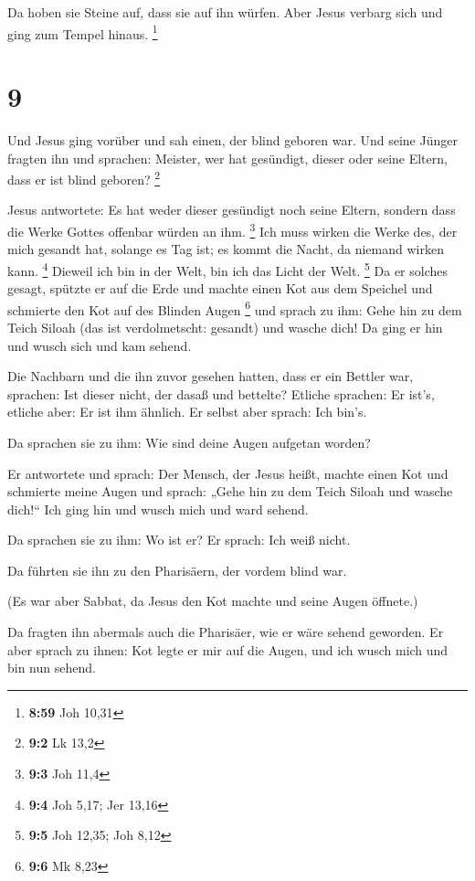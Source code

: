  Da hoben sie Steine auf, dass sie auf ihn würfen. Aber
Jesus verbarg sich und ging zum Tempel hinaus. \footnote{\textbf{8:59}
  Joh 10,31}

\hypertarget{section-4}{%
\section{9}\label{section-4}}

 Und Jesus ging vorüber und sah einen, der blind geboren
war.  Und seine Jünger fragten ihn und sprachen: Meister,
wer hat gesündigt, dieser oder seine Eltern, dass er ist blind geboren?
\footnote{\textbf{9:2} Lk 13,2}

 Jesus antwortete: Es hat weder dieser gesündigt noch seine
Eltern, sondern dass die Werke Gottes offenbar würden an ihm.
\footnote{\textbf{9:3} Joh 11,4}  Ich muss wirken die Werke
des, der mich gesandt hat, solange es Tag ist; es kommt die Nacht, da
niemand wirken kann. \footnote{\textbf{9:4} Joh 5,17; Jer 13,16}
 Dieweil ich bin in der Welt, bin ich das Licht der Welt.
\footnote{\textbf{9:5} Joh 12,35; Joh 8,12}  Da er solches
gesagt, spützte er auf die Erde und machte einen Kot aus dem Speichel
und schmierte den Kot auf des Blinden Augen \footnote{\textbf{9:6} Mk
  8,23}  und sprach zu ihm: Gehe hin zu dem Teich Siloah
(das ist verdolmetscht: gesandt) und wasche dich! Da ging er hin und
wusch sich und kam sehend.

 Die Nachbarn und die ihn zuvor gesehen hatten, dass er ein
Bettler war, sprachen: Ist dieser nicht, der dasaß und bettelte?
 Etliche sprachen: Er ist's, etliche aber: Er ist ihm
ähnlich. Er selbst aber sprach: Ich bin's.

 Da sprachen sie zu ihm: Wie sind deine Augen aufgetan
worden?

 Er antwortete und sprach: Der Mensch, der Jesus heißt,
machte einen Kot und schmierte meine Augen und sprach: „Gehe hin zu dem
Teich Siloah und wasche dich!{}`` Ich ging hin und wusch mich und ward
sehend.

 Da sprachen sie zu ihm: Wo ist er? Er sprach: Ich weiß
nicht.

 Da führten sie ihn zu den Pharisäern, der vordem blind
war.

 (Es war aber Sabbat, da Jesus den Kot machte und seine
Augen öffnete.)

 Da fragten ihn abermals auch die Pharisäer, wie er wäre
sehend geworden. Er aber sprach zu ihnen: Kot legte er mir auf die
Augen, und ich wusch mich und bin nun sehend.

